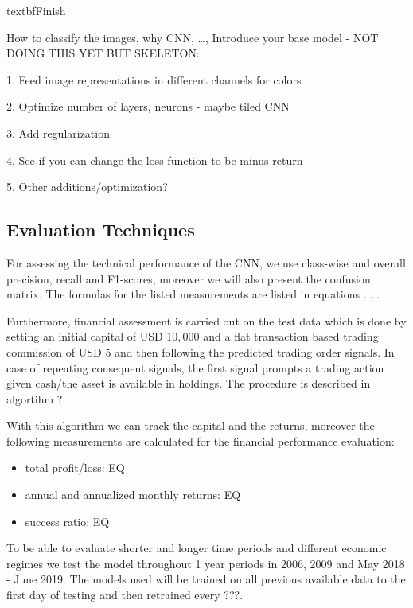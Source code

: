 \documentclass[11pt, a4paper]{article}
\begin{document}
textbf{Finish}


How to classify the images, why CNN, \dots, 
Introduce your base model - NOT DOING THIS YET BUT SKELETON:

1. Feed image representations in different channels for colors

2. Optimize number of layers, neurons - maybe tiled CNN

3. Add regularization

4. See if you can change the loss function to be minus return

5. Other additions/optimization?

\subsection{Evaluation Techniques}

For assessing the technical performance of the CNN, we use class-wise and overall precision, recall and F1-scores, moreover we will also present the confusion matrix. 
The formulas for the listed measurements are listed in equations ... .

Furthermore, financial assessment is carried out on the test data which is done by setting an initial capital of USD $10,000$ and a flat transaction based trading commission of USD $5$ and then following the predicted trading order signals.
In case of repeating consequent signals, the first signal prompts a trading action given cash/the asset is available in holdings. The procedure is described in algortihm ?.

With this algorithm we can track the capital and the returns, moreover the following measurements are calculated for the financial performance evaluation:

\begin{itemize}
    \item total profit/loss: EQ
    \item annual and annualized monthly returns: EQ
    \item success ratio: EQ 
\end{itemize}

To be able to evaluate shorter and longer time periods and different economic regimes we test the model throughout 1 year periods in 2006, 2009 and May 2018 - June 2019. The models used will be trained on all previous available data to the first day of testing and then retrained every ???.
\end{document}
